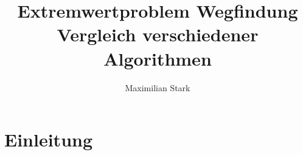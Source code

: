 \documentclass[12pt]{article}
\begin{document}
\renewcommand{\figurename}{Abb.}
\def\figureautorefname{Abb.}
\def\algorithmautorefname{Alg.}


\title{Extremwertproblem Wegfindung \\  \large{\enspace Vergleich verschiedener Algorithmen}}

\author{Maximilian Stark}

\maketitle
\thispagestyle{empty}
\clearpage

\tableofcontents
\thispagestyle{empty}
\clearpage

\section{Einleitung}
\newpage
\end{document}
